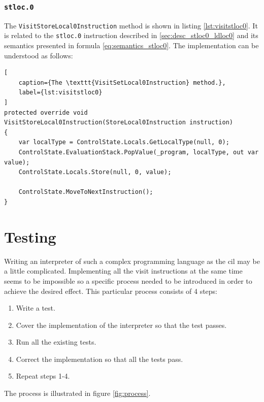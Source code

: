 \documentclass{article}
\numberwithin{equation}{section}
\begin{document}
\subsubsection{\texttt{stloc.0}}

The \texttt{VisitStoreLocal0Instruction} method is shown in listing \ref{lst:visitstloc0}. It is related to the \texttt{stloc.0} instruction described in \ref{sec:desc_stloc0_ldloc0} and its semantics presented in formula \ref{eq:semantics_stloc0}. The implementation can be understood as follows:


\begin{lstlisting}[
	caption={The \texttt{VisitSetLocal0Instruction} method.},
	label={lst:visitstloc0}
]
protected override void VisitStoreLocal0Instruction(StoreLocal0Instruction instruction)
{
	var localType = ControlState.Locals.GetLocalType(null, 0);
	ControlState.EvaluationStack.PopValue(_program, localType, out var value);
	ControlState.Locals.Store(null, 0, value);

	ControlState.MoveToNextInstruction();
}
\end{lstlisting}

\clearpage


\section{Testing}

Writing an interpreter of such a complex programming language as the \acrshort{cil} may be a little complicated. Implementing all the visit instructions at the same time seems to be impossible so a specific process needed to be introduced in order to achieve the desired effect. This particular process consists of 4 steps:
\begin{enumerate}
	\item{Write a test.}
	\item{Cover the implementation of the interpreter so that the test passes.}
	\item{Run all the existing tests.}
	\item{Correct the implementation so that all the tests pass.}
	\item{Repeat steps 1-4.}
\end{enumerate}
The process is illustrated in figure \ref{fig:process}.
\end{document}
